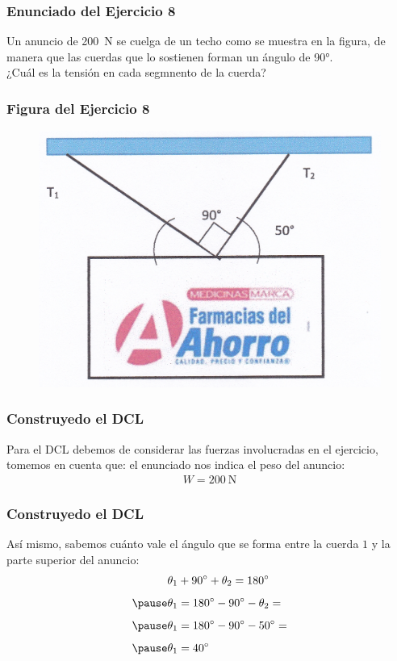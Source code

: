 \documentclass[12pt]{beamer}
\begin{document}
\begin{frame}
\frametitle{Enunciado del Ejercicio 8}
Un anuncio de \SI{200}{\newton} se cuelga de un techo como se muestra en la figura, de manera que las cuerdas que lo sostienen forman un ángulo de \ang{90}.
\\
\bigskip
\pause
¿Cuál es la tensión en cada segmnento de la cuerda?
\end{frame}
\begin{frame}
\frametitle{Figura del Ejercicio 8}
\begin{figure}
  \centering
  \includegraphics[scale=0.9]{Imagenes/DCL_Problema_08.png}
\end{figure}
\end{frame}
\begin{frame}
\frametitle{Construyedo el DCL}
Para el DCL debemos de considerar las fuerzas involucradas en el ejercicio, tomemos en cuenta que: \pause el enunciado nos indica el peso del anuncio:
\begin{align*}
W = \SI{200}{\newton}
\end{align*}
\end{frame}
\begin{frame}
\frametitle{Construyedo el DCL}
Así mismo, sabemos cuánto vale el ángulo que se forma entre la cuerda $1$ y la parte superior del anuncio:
\pause
\begin{eqnarray*}
\begin{aligned}
\theta_{1} &+ \ang{90} + \theta_{2} = \ang{180} \\[0.5em] \pause
\theta_{1} &= \ang{180} - \ang{90} - \theta_{2} = \\[0.5em] \pause
\theta_{1} &= \ang{180} - \ang{90} - \ang{50} = \\[0.5em] \pause
\theta_{1} &= \ang{40}
\end{aligned}
\end{eqnarray*} 
\end{frame}
\end{document}
